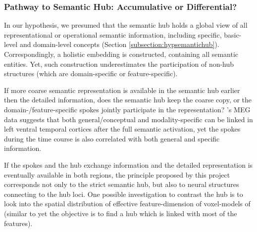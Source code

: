 \subsubsection{Pathway to Semantic Hub: Accumulative or Differential?}

In our hypothesis, we presumed that the semantic hub holds a global view of all representational or operational semantic information, including specific, basic-level and domain-level concepts (Section \ref{subsection:hypsemantichub}). Correspondingly, a holistic \similarity embedding is constructed, containing all semantic entities. Yet, such construction underestimates the participation of non-hub structures (which are domain-specific or feature-specific). 

If more coarse semantic representation is available in the semantic hub earlier then the detailed information, does the semantic hub keep the coarse copy, or the domain-\slash feature-specific spokes jointly participate in the representation? \textcite{clarkePerceptionConceptionHow2013}'s MEG data suggests that both general/conceptual and modality-specific can be linked in left ventral temporal cortices after the full semantic activation, yet the spokes during the time course is also correlated with both general and specific information. 

If the spokes and the hub exchange information and the detailed representation is eventually available in both regions, the \similarity principle proposed by this project corresponds not only to the strict semantic hub, but also to neural structures connecting to the hub loci. One possible investigation to contrast the hub is to look into the spatial distribution of effective feature-dimension of voxel-models of  (similar to \textcite{huthContinuousSemanticSpace2012} yet the objective is to find a hub which is linked with most of the features). 
